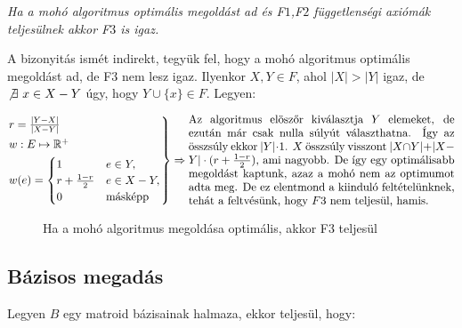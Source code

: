 \vspace{0.4cm}
\emph{Ha a mohó algoritmus optimális megoldást ad és F$1$,F$2$ függetlenségi axiómák
teljesülnek akkor F$3$ is igaz.}
\vspace{0.4cm}

A bizonyitás ismét indirekt, tegyük fel, hogy a mohó algoritmus optimális megoldást ad, de
F$3$ nem lesz igaz. Ilyenkor $X,Y \in F$, ahol $|X|>|Y|$ igaz, de $\not \exists~x \in X-Y$ úgy, hogy
$Y \cup \{x\} \in F$. Legyen:

\[
\begin{rcases}
r=\frac{|Y-X|}{|X-Y|}\\
w : E \mapsto \mathbb{R}^+ \\
w(e) = \begin{cases}
1 & e \in Y, \\
r + \frac{1-r}{2} & e \in X-Y, \\
0 & \mbox{másképp}
\end{cases}
\end{rcases}\Rightarrow
\parbox[L]{8.25cm}{
Az algoritmus elöszőr kiválasztja $Y$ elemeket, de ezután már csak nulla súlyút
választhatna. Így az összsúly ekkor $|Y|\cdot 1$. $X$ összsúly visszont $|X \cap
Y| + |X-Y|\cdot(r+\frac{1-r}{2})$, ami nagyobb. De így egy optimálisabb megoldást
kaptunk, azaz a mohó nem az optimumot adta meg. De ez elentmond a kiinduló feltételünknek,
tehát a feltvésünk, hogy $F$3 nem teljesül, hamis. } \]

\begin{figure}[htbp]
\centering
{}
\caption{Ha a mohó algoritmus megoldása optimális, akkor F3 teljesül}\label{fig:Mohó}
\end{figure}

\subsection{Bázisos megadás}
Legyen $B$ egy matroid bázisainak halmaza, ekkor teljesül, hogy:

